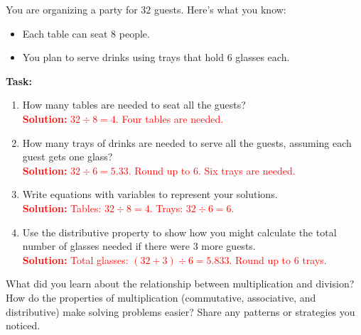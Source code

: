 \documentclass[12pt]{article}
\begin{document}
\vspace{1em}

\begin{tcolorbox}[colframe=black!60, colback=white, 
coltitle=black, colbacktitle=black!15, fonttitle=\bfseries\Large, 
title=Performance Task: Planning a Party, halign title=center, left=10pt, right=10pt, top=10pt, bottom=50pt]
You are organizing a party for \(32\) guests. Here’s what you know:
\begin{itemize}
    \item Each table can seat \(8\) people.
    \item You plan to serve drinks using trays that hold \(6\) glasses each.
\end{itemize}
\textbf{Task:}
\begin{enumerate}[itemsep=3em]
    \item How many tables are needed to seat all the guests?\\
    \textcolor{red}{\textbf{Solution:} \(32 \div 8 = 4\). Four tables are needed.}

    \item How many trays of drinks are needed to serve all the guests, assuming each guest gets one glass?\\
    \textcolor{red}{\textbf{Solution:} \(32 \div 6 = 5.33\). Round up to \(6\). Six trays are needed.}

    \item Write equations with variables to represent your solutions.\\
    \textcolor{red}{\textbf{Solution:} Tables: \(32 \div 8 = 4\). Trays: \(32 \div 6 = 6\).}

    \item Use the distributive property to show how you might calculate the total number of glasses needed if there were \(3\) more guests.\\
    \textcolor{red}{\textbf{Solution:} Total glasses: \((32 + 3) \div 6 = 5.833\). Round up to \(6\) trays.}
\end{enumerate}
\end{tcolorbox}

\begin{tcolorbox}[colframe=black!60, colback=white, 
coltitle=black, colbacktitle=black!15, fonttitle=\bfseries\Large, 
title=Reflection, halign title=center, left=10pt, right=10pt, top=10pt, bottom=80pt]
What did you learn about the relationship between multiplication and division? How do the properties of multiplication (commutative, associative, and distributive) make solving problems easier? Share any patterns or strategies you noticed.
\end{tcolorbox}
\end{document}
